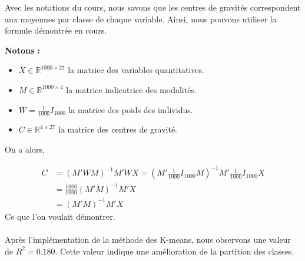 \documentclass{article}
\begin{document}
Avec les notations du cours, nous savons que les centres de gravités correspondent aux moyennes par classe de chaque variable. Ainsi, nous pouvons utiliser la formule démontrée en cours.
\par\textbf{Notons :}
\begin{itemize}
    \item $X \in \mathbb{R}^{1000\times 27}$ la matrice des variables quantitatives.
    \item $M \in \mathbb{R}^{1000\times 4}$ la matrice indicatrice des modalités.
    \item $W = \frac{1}{1000} I_{1000}$ la matrice des poids des individus.
    \item $C \in \mathbb{R}^{4\times 27}$ la matrice des centres de gravité.
\end{itemize}

On a alors, 

\begin{align*}
    C &= (M'WM)^{-1}M'WX = (M'\frac{1}{1000} I_{1000} M)^{-1}M' \frac{1}{1000} I_{1000} X \\
    &=\frac{1000}{1000}(M'M)^{-1} M'X \\
    &= (M'M)^{-1} M'X
\end{align*}
Ce que l'on voulait démontrer.
\\
\\
Après l'implémentation de la méthode des K-means, nous observons une valeur de $R^2=0.180$. Cette valeur indique une amélioration de la partition des classes.
\end{document}

